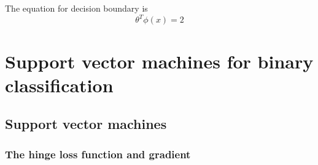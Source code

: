 \documentclass{article}
\begin{document}
\subsection{}
The equation for decision boundary is
\begin{equation*}
	\theta^T \phi(x) = 2
\end{equation*}

\section{Support vector machines for binary classification}

\subsection{Support vector machines}
\subsubsection{The hinge loss function and gradient}
\end{document}
